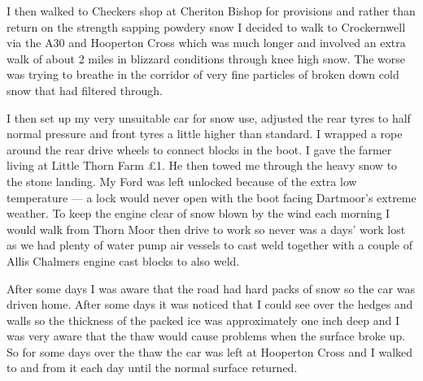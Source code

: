 I then walked to Checkers shop at Cheriton Bishop for provisions and rather than
return on the strength sapping powdery snow I decided to walk to Crockernwell
via the A30 and Hooperton Cross which was much longer and involved an extra
walk of about 2 miles in blizzard conditions through knee high snow. The worse
was trying to breathe in the corridor of very fine particles of broken down
cold snow that had filtered through.

I then set up my very unsuitable car for snow use, adjusted the rear tyres to
half normal pressure and front tyres a little higher than standard. I wrapped
a rope around the rear drive wheels to connect blocks in the boot. I gave the
farmer living at Little Thorn Farm £1. He then towed me through the heavy snow
to the stone landing. My Ford was left unlocked because of the extra low
temperature --- a lock would never open with the boot facing Dartmoor's extreme
weather. To keep the engine clear of snow blown by the wind each
morning I would walk from Thorn Moor then drive to work so never was a days'
work lost as we had plenty of water pump air vessels to cast weld together with
a couple of Allis Chalmers engine cast blocks to also weld.

After some days I was aware that the road had hard packs of snow so the car was
driven home. After some days it was noticed that I could see over the hedges
and walls so the thickness of the packed ice was approximately one inch deep
and I was very aware that the thaw would cause problems when the surface broke
up. So for some days over the thaw the car was left at Hooperton Cross and I
walked to and from it each day until the normal surface returned.
